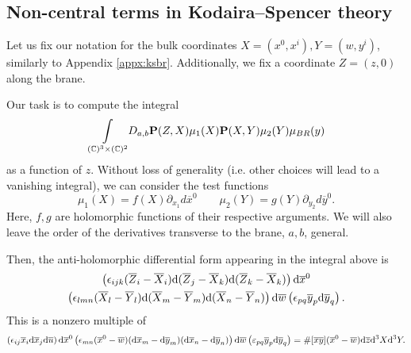 \documentclass[../main.tex]{subfiles}
\begin{document}
\subsection{Non-central terms in Kodaira--Spencer theory}\label{appx:noncentral}

Let us fix our notation for the bulk coordinates $X = (x^0, x^i), Y = (w, y^i)$, similarly to Appendix \ref{appx:ksbr}. Additionally, we fix a coordinate $Z = (z, 0)$ along the brane. 

Our task is to compute the integral
\begin{equation}
    \underset{(\mathbb{C})^3 \times (\mathbb{C})^2}{\int} D_{a,b} \bold{P}(Z,X) \mu_1(X) \bold{P}(X,Y) \mu_2(Y) \mu_{BR}(y)
\end{equation} as a function of $z$.
Without loss of generality (i.e. other choices will lead to a vanishing integral), we can consider the test functions
\begin{equation}
    \mu_1(X) = f(X) \partial_{x_1} d\overline{x}^0 \quad \quad \mu_2(Y) = g(Y) \partial_{y_2} d\overline{y}^0.
\end{equation} Here, $f, g$ are holomorphic functions of their respective arguments.
We will also leave the order of the derivatives transverse to the brane, $a, b$, general.


%

Then, the anti-holomorphic differential form appearing in the integral above is
\begin{multline}
\left({\epsilon}_{ijk} (\overline Z_i - \overline X_i) \mathrm{d} (\overline Z_j - \overline X_k) \mathrm{d} (\overline Z_k - \overline X_k)\right) \mathrm{d} \overline{x}^0\\ \left({\epsilon}_{lmn} (\overline X_l - \overline Y_l) \mathrm{d} (\overline X_m - \overline Y_m) \mathrm{d} (\overline X_n - \overline Y_n)\right)\mathrm{d} \overline{w} \left({\epsilon}_{pq} \overline y_p \mathrm{d} \overline y_q \right).
\end{multline}
This is a nonzero multiple of
\begin{multline}
\left({\epsilon}_{ij} \overline x_i \mathrm{d} \overline x_j \mathrm{d} \overline u\right) \mathrm{d} \overline{x}^0 \left({\epsilon}_{mn} (\overline x^0 - \overline w) (\mathrm{d} \overline x_m - \mathrm{d} \overline y_m) (\mathrm{d} \overline x_n - \mathrm{d} \overline y_n) \right)
\mathrm{d} \overline w \left(\varepsilon_{pq} \overline y_p  \mathrm{d} \overline y_q\right) = 
\# [\overline x \overline y] (\overline x^0 - \overline w) \mathrm{d} \overline z \mathrm{d}^3 X \mathrm{d}^3 Y .
\end{multline}
\end{document}
